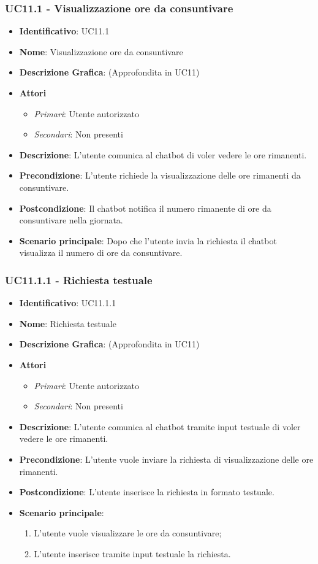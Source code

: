 \subsubsection{UC11.1 - Visualizzazione ore da consuntivare}
\begin{itemize}
	\item \textbf{Identificativo}: UC11.1
	\item \textbf{Nome}: Visualizzazione ore da consuntivare
	\item \textbf{Descrizione Grafica}: (Approfondita in UC11)
	\item \textbf{Attori}
	\begin{itemize} 
		\item \textit{Primari}: Utente autorizzato
		\item \textit{Secondari}: Non presenti
	\end{itemize}
	\item \textbf{Descrizione}: L'utente comunica al chatbot di voler vedere le ore rimanenti.
	\item \textbf{Precondizione}: L'utente richiede la visualizzazione delle ore rimanenti da consuntivare.
	\item \textbf{Postcondizione}: Il chatbot notifica il numero rimanente di ore da consuntivare nella giornata.
	\item \textbf{Scenario principale}: Dopo che l'utente invia la richiesta il chatbot visualizza il numero di ore da consuntivare.
\end{itemize}

\subsubsection{UC11.1.1 - Richiesta testuale}
\begin{itemize}
	\item \textbf{Identificativo}: UC11.1.1
	\item \textbf{Nome}: Richiesta testuale
	\item \textbf{Descrizione Grafica}: (Approfondita in UC11)
	\item \textbf{Attori}
	\begin{itemize} 
		\item \textit{Primari}: Utente autorizzato
		\item \textit{Secondari}: Non presenti
	\end{itemize}
	\item \textbf{Descrizione}: L'utente comunica al chatbot tramite input testuale di voler vedere le ore rimanenti.
	\item \textbf{Precondizione}: L'utente vuole inviare la richiesta di visualizzazione delle ore rimanenti.
	\item \textbf{Postcondizione}: L'utente inserisce la richiesta in formato testuale.
	\item \textbf{Scenario principale}:
	\begin{enumerate}
		\item L'utente vuole visualizzare le ore da consuntivare;
		\item L'utente inserisce tramite input testuale la richiesta.
	\end{enumerate}
\end{itemize}

